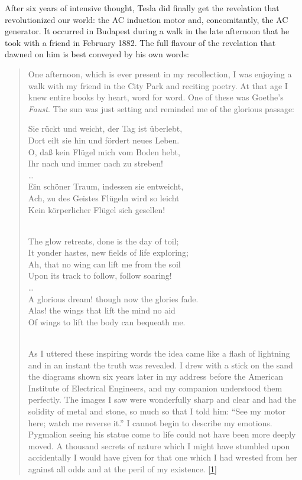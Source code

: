 \documentclass[
  a4paper,
]{article}
\begin{document}
After six years of intensive thought, Tesla did finally get the
revelation that revolutionized our world: the AC induction motor and,
concomitantly, the AC generator. It occurred in Budapest during a walk
in the late afternoon that he took with a friend in February 1882. The
full flavour of the revelation that dawned on him is best conveyed by
his own words:

\begin{quote}
One afternoon, which is ever present in my recollection, I was enjoying
a walk with my friend in the City Park and reciting poetry. At that age
I knew entire books by heart, word for word. One of these was Goethe's
\emph{Faust}. The sun was just setting and reminded me of the glorious
passage:

Sie rückt und weicht, der Tag ist überlebt,\\
Dort eilt sie hin und fördert neues Leben.\\
O, daß kein Flügel mich vom Boden hebt,\\
Ihr nach und immer nach zu streben!\\
\ldots{}\\
Ein schöner Traum, indessen sie entweicht,\\
Ach, zu des Geistes Flügeln wird so leicht\\
Kein körperlicher Flügel sich gesellen!\\
\strut \\
The glow retreats, done is the day of toil;\\
It yonder hastes, new fields of life exploring;\\
Ah, that no wing can lift me from the soil\\
Upon its track to follow, follow soaring!\\
\ldots{}\\
A glorious dream! though now the glories fade.\\
Alas! the wings that lift the mind no aid\\
Of wings to lift the body can bequeath me.\\
\strut \\

As I uttered these inspiring words the idea came like a flash of
lightning and in an instant the truth was revealed. I drew with a stick
on the sand the diagrams shown six years later in my address before the
American Institute of Electrical Engineers, and my companion understood
them perfectly. The images I saw were wonderfully sharp and clear and
had the solidity of metal and stone, so much so that I told him: ``See
my motor here; watch me reverse it.'' I cannot begin to describe my
emotions. Pygmalion seeing his statue come to life could not have been
more deeply moved. A thousand secrets of nature which I might have
stumbled upon accidentally I would have given for that one which I had
wrested from her against all odds and at the peril of my existence.
\protect\hyperlink{ref-john83}{{[}1{]}}
\end{quote}
\end{document}

